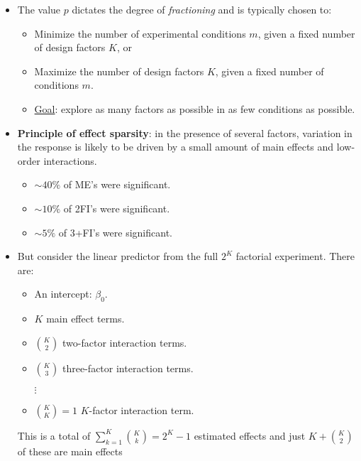 \begin{itemize}
      \item The value $ p $ dictates the degree of \emph{fractioning} and is typically chosen to:
            \begin{itemize}[$\rightarrow$]
                  \item Minimize the number of experimental conditions $ m $, given a fixed number of design factors $ K $, or
                  \item Maximize the number of design factors $ K $, given a fixed number of conditions $ m $.
            \end{itemize}
            \begin{itemize}[*]
                  \item \underline{Goal}: explore as many factors as possible in as few conditions as possible.
            \end{itemize}
      \item \textbf{Principle of effect sparsity}: in the presence of several factors, variation in the response is likely to
            be driven by a small amount of main effects and low-order interactions.
            \begin{itemize}[$\rightarrow$]
                  \item $ \sim 40\% $ of ME's were significant.
                  \item $ \sim 10\% $ of 2FI's were significant.
                  \item $ \sim 5\% $ of 3+FI's were significant.
            \end{itemize}
      \item But consider the linear predictor from the full $ 2^K $ factorial experiment. There are:
            \begin{itemize}
                  \item An intercept: $ \beta_0 $.
                  \item $ K $ main effect terms.
                  \item $ \binom{K}{2} $ two-factor interaction terms.
                  \item $ \binom{K}{3} $ three-factor interaction terms.
                  \item[$\vdots$]
                  \item $ \binom{K}{K}=1 $ $ K $-factor interaction term.
            \end{itemize}
            This is a total of $ \sum_{k=1}^{K}\binom{K}{k}=2^K-1 $ estimated effects and just $ K+\binom{K}{2} $ of these are main effects

\end{itemize}
